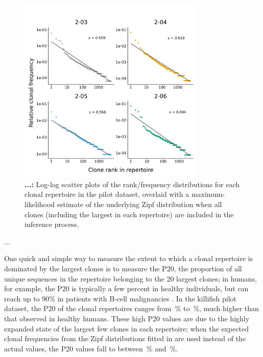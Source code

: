 \begin{figure}
\centering
\includegraphics[width=0.8\textwidth]{_Figures/png/pilot-clones-zipf-fit-null}
\caption[...]{\textbf{...:} Log-log scatter plots of the rank/frequency distributions for each clonal repertoire in the pilot dataset, overlaid with a maximum-likelihood estimate of the underlying Zipf distribution when all clones (including the largest in each repertoire) are included in the inference process.}
\label{fig:igseq-pilot-clones-zipf-fit-null}
\end{figure} %

...

One quick and simple way to measure the extent to which a clonal repertoire is dominated by the largest clones is to measure the P20, the proportion of all unique sequences in the repertoire belonging to the 20 largest clones; in humans, for example, the P20 is typically a few percent in healthy individuals, but can reach up to 90\% in patients with B-cell malignancies \parencite{rosenfeld2018clonesize}. In the killifish pilot dataset, the P20 of the clonal repertoires ranges from \,\% to \,\%, much higher than that observed in healthy humans. These high P20 values are due to the highly expanded state of the largest few clones in each repertoire; when the expected clonal frequencies from the Zipf distributions fitted in  are used instead of the actual values, the P20 values fall to between \,\% and \,\%.

